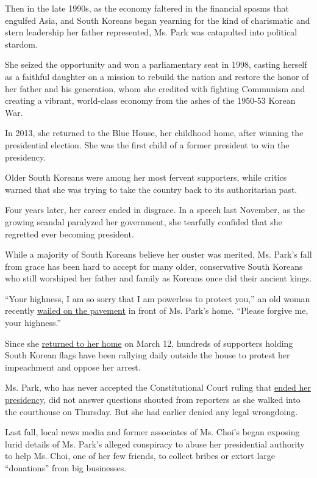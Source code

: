 Then in the late 1990s, as the economy faltered in the financial spasms
that engulfed Asia, and South Koreans began yearning for the kind of
charismatic and stern leadership her father represented, Ms. Park was
catapulted into political stardom.

She seized the opportunity and won a parliamentary seat in 1998, casting
herself as a faithful daughter on a mission to rebuild the nation and
restore the honor of her father and his generation, whom she credited
with fighting Communism and creating a vibrant, world-class economy from
the ashes of the 1950-53 Korean War.

In 2013, she returned to the Blue House, her childhood home, after
winning the presidential election. She was the first child of a former
president to win the presidency.

Older South Koreans were among her most fervent supporters, while
critics warned that she was trying to take the country back to its
authoritarian past.

Four years later, her career ended in disgrace. In a speech last
November, as the growing scandal paralyzed her government, she tearfully
confided that she regretted ever becoming president.

While a majority of South Koreans believe her ouster was merited, Ms.
Park's fall from grace has been hard to accept for many older,
conservative South Koreans who still worshiped her father and family as
Koreans once did their ancient kings.

``Your highness, I am so sorry that I am powerless to protect you,'' an
old woman recently
\href{http://www.wikitree.co.kr/main/news_view.php?id=295753}{wailed on
the pavement} in front of Ms. Park's home. ``Please forgive me, your
highness.''

Since she
\href{https://www.nytimes.com/2017/03/12/world/asia/park-geun-hye-blue-house.html}{returned
to her home} on March 12, hundreds of supporters holding South Korean
flags have been rallying daily outside the house to protest her
impeachment and oppose her arrest.

Ms. Park, who has never accepted the Constitutional Court ruling that
\href{https://www.nytimes.com/2017/03/09/world/asia/park-geun-hye-impeached-south-korea.html}{ended
her presidency}, did not answer questions shouted from reporters as she
walked into the courthouse on Thursday. But she had earlier denied any
legal wrongdoing.

Last fall, local news media and former associates of Ms. Choi's began
exposing lurid details of Ms. Park's alleged conspiracy to abuse her
presidential authority to help Ms. Choi, one of her few friends, to
collect bribes or extort large ``donations'' from big businesses.

